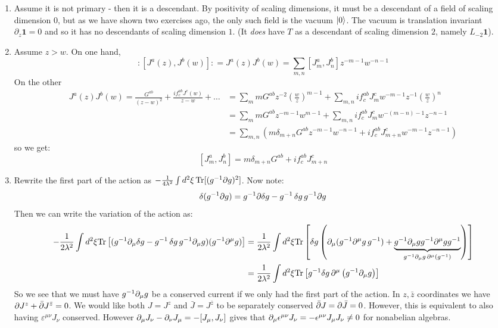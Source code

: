 \documentclass[11pt]{article}
\begin{document}
\begin{enumerate}
	\item Assume it is not primary - then it is a descendant. By positivity of scaling dimensions, it must be a descendant of a field of scaling dimension $0$, but as we have shown two exercises ago, the only such field is the vacuum $\ket 0$. The vacuum is translation invariant $\partial_z \mathbf{1} = 0$ and so it has no descendants of scaling dimension $1$. (It \emph{does} have $T$ as a descendant of scaling dimension $2$, namely $L_{-2} \mathbf{1}$).
	
	\item Assume $z > w$. On one hand, 
	\[
		:[J^a(z), J^b(w)]: = J^a(z) J^b(w) = \sum_{m, n} [J_m^a, J_n^b] z^{-m-1} w^{-n-1}
	\]
	On the other 
	\[
		\begin{aligned}
		J^a(z) J^b(w) = \frac{G^{ab}}{(z-w)^2} + \frac{i f^{ab}_c J^c(w)}{z-w} + \dots 
		&= \sum_{m} m G^{ab} z^{-2} \left(\frac{w}{z}\right)^{m-1} + \sum_{m,n} i f^{ab}_c J^c_m w^{-m-1} z^{-1} \left( \frac{w}{z} \right)^n\\
		&= \sum_m m G^{ab} z^{-m-1} w^{m-1} + \sum_{m,n} i f^{ab}_c J^c_m w^{-(m-n)-1} z^{-n-1}\\
		&= \sum_{m, n} \left(m \delta_{m+n} G^{ab} z^{-m-1} w^{-n-1} + i f^{ab}_c J^c_{m+n} w^{-m-1} z^{-n-1} \right)
		\end{aligned}
	\]
	so we get:
	\[
		[J^a_m, J^b_n] = m \delta_{m+n} G^{ab} + i f^{ab}_c J^c_{m+n}
	\]
	\item Rewrite the first part of the action as $-\frac{1}{4\lambda^2} \int d^2 \xi\, \mathrm{Tr}[(g^{-1} \partial g)^2]$. Now note:
	\[
		\delta(g^{-1} \partial g) = g^{-1} \partial \delta g - g^{-1}\, \delta g\, g^{-1} \partial g
	\]
	Then we can write the variation of the action as:
	\[
	\begin{aligned}
				- \frac{1}{2 \lambda^2} \int d^2 \xi \mathrm{Tr} \left[ (g^{-1} \partial_\mu \delta g - g^{-1}\, \delta g\, g^{-1} \partial_\mu g) (g^{-1} \partial^\mu g) \right]
				&=  \frac{1}{2 \lambda^2} \int d^2 \xi \mathrm{Tr} \left[ \delta g \left(\partial_\mu(g^{-1} \partial^\mu g\, g^{-1}) + \underbrace{g^{-1} \partial_\mu g g^{-1} \partial^\mu g g^{-1}}_{g^{-1} \partial_\mu g\, \partial^\mu(g^{-1})}\right) \right]\\
		&= \frac{1}{2 \lambda^2} \int d^2 \xi \mathrm{Tr} \left[ g^{-1} \delta g \, \partial^\mu \left(g^{-1} \partial_\mu g \right) \right]		
	\end{aligned}
	\]
	So we see that we must have $g^{-1} \partial_\mu g$ be a conserved current if we only had the first part of the action. In $z, \bar z$ coordinates we have $\partial J^z + \bar {\partial} J^{\bar z} = 0$. We would like both $J = J^z$ and $\bar J = J^{\bar z}$ to be separately conserved $\bar {\partial} J = \partial \bar J = 0$. However, this is equivalent to also having $\varepsilon^{\mu \nu} J_\nu$ conserved. However $\partial_\mu J_\nu - \partial_\nu J_\mu = -[J_\mu, J_\nu]$ gives that $\partial_\mu \epsilon^{\mu \nu} J_\nu = - \epsilon^{\mu \nu} J_\mu J_\nu \neq 0$ for nonabelian algebras. 
	

\end{enumerate}
\end{document}
